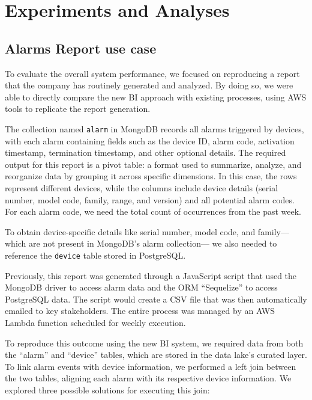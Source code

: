 
\chapter{Experiments and Analyses}
\label{chp:experiments}

\section{Alarms Report use case}
To evaluate the overall system performance, we focused on reproducing a report that the company has routinely generated and analyzed. By doing so, we were able to directly compare the new \ac{BI} approach with existing processes, using \ac{AWS} tools to replicate the report generation.

The collection named \texttt{alarm} in MongoDB records all alarms triggered by devices, with each alarm containing fields such as the device ID, alarm code, activation timestamp, termination timestamp, and other optional details. The required output for this report is a pivot table: a format used to summarize, analyze, and reorganize data by grouping it across specific dimensions. In this case, the rows represent different devices, while the columns include device details (serial number, model code, family, range, and version) and all potential alarm codes. For each alarm code, we need the total count of occurrences from the past week.

To obtain device-specific details like serial number, model code, and family— which are not present in MongoDB's alarm collection— we also needed to reference the \texttt{device} table stored in PostgreSQL.

Previously, this report was generated through a JavaScript script that used the MongoDB driver to access alarm data and the \ac{ORM} “Sequelize” to access PostgreSQL data. The script would create a \ac{CSV} file that was then automatically emailed to key stakeholders. The entire process was managed by an \ac{AWS} Lambda function scheduled for weekly execution.

To reproduce this outcome using the new \ac{BI} system, we required data from both the “alarm” and “device” tables, which are stored in the data lake's curated layer. To link alarm events with device information, we performed a left join between the two tables, aligning each alarm with its respective device information. We explored three possible solutions for executing this join:

